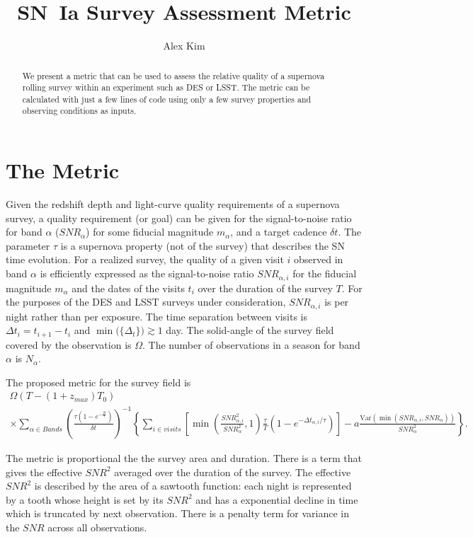 \documentclass[preprint]{aastex}
\newcommand\SNR{\mathit{SNR}}
\newcommand{\Var}{\mathrm{Var}}
\begin{document}
\title{SN~Ia Survey Assessment Metric}
\author{Alex Kim}
\begin{abstract}
We present a metric that can be used to assess the relative quality of a supernova rolling survey within
an experiment such as DES or LSST.
The metric can be calculated with just a few lines of code using
only a few survey properties and observing conditions as inputs.
\end{abstract}

\section{The Metric}
Given the redshift depth and light-curve quality requirements of a supernova survey, a quality requirement (or goal) can be given
for the  signal-to-noise ratio for band $\alpha$ ($\SNR_\alpha$) for some fiducial magnitude $m_\alpha$, and a target cadence $\delta t$.
The parameter $\tau$ is a supernova property  (not of the survey) that describes the SN time evolution.
For a realized survey, the quality of a given visit $i$ observed in band $\alpha$ is efficiently expressed as the signal-to-noise ratio $\SNR_{\alpha, i}$
for the fiducial magnitude $m_\alpha$ and the dates of the visits $t_i$ over the duration of the survey $T$.  For the purposes
of the DES and LSST surveys under consideration, $\SNR_{\alpha, i}$ is per night rather than per exposure.
The time separation between visits is $\Delta t_i=t_{i+1}-t_i$ and $\min{(\{\Delta_t\}}) \gtrsim 1$ day.  The solid-angle of the survey field covered
by the observation is $\Omega$.  The number of observations in a season for band $\alpha$ is $N_\alpha$.


The proposed metric for the survey field is
\begin{multline}
	\Omega \left(T-(1+z_{max})T_0\right)   \\
	\times
	\sum_{\alpha \in Bands}	
		\left(
		\frac{\tau(1-e^{-\frac{\delta t}{\tau}})}{\delta t}\right)^{-1}		\left\{
			\sum_{i \in visits}		\left[ 		\min{\left(
				\frac{\SNR_{\alpha,i}^2}{\SNR_{\alpha}^{2} } ,1 \right)}
				\frac{\tau}{T}	\left(1-e^{-\Delta t_{\alpha,i}/\tau}\right)\right]
				-a\frac{\Var\left(\min{\left(
				\SNR_{\alpha,i},{\SNR_{\alpha} }  \right)}
				\right)}{\SNR_\alpha^2}
				\right\}.
\end{multline}

The metric is proportional the the survey area and duration.  There is a term that gives the effective $\SNR^2$ averaged
over the duration of the survey.  The effective $\SNR^2$ is described by the area of a sawtooth function: each night is represented by a tooth
whose height is set by its $\SNR^2$ and has a exponential decline in time which is truncated by  next observation.  There is a penalty term
for variance in the $\SNR$ across all observations.
\end{document}
